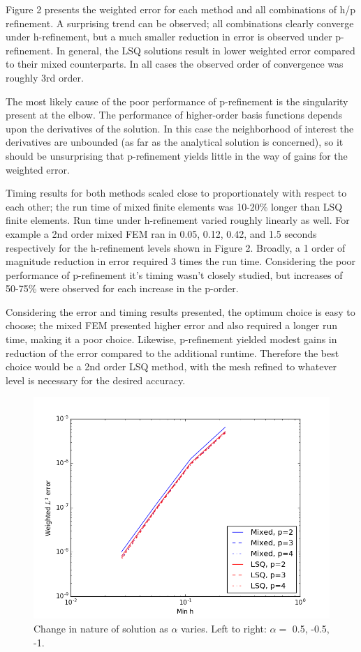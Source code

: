 \documentclass[letterpaper,10pt]{article}
\begin{document}
Figure 2 presents the weighted error for each method and all combinations of h/p refinement. A surprising trend can be observed; all combinations clearly converge under h-refinement, but a much smaller reduction in error is observed under p-refinement. In general, the LSQ solutions result in lower weighted error compared to their mixed counterparts. In all cases the observed order of convergence was roughly 3rd order.

The most likely cause of the poor performance of p-refinement is the singularity present at the elbow. The performance of higher-order basis functions depends upon the derivatives of the solution. In this case the neighborhood of interest the derivatives are unbounded (as far as the analytical solution is concerned), so it should be unsurprising that p-refinement yields little in the way of gains for the weighted error.

Timing results for both methods scaled close to proportionately with respect to each other; the run time of mixed finite elements was 10-20\% longer than LSQ finite elements. Run time under h-refinement varied roughly linearly as well. For example a 2nd order mixed FEM ran in 0.05, 0.12, 0.42, and 1.5 seconds respectively for the h-refinement levels shown in Figure 2. Broadly, a 1 order of magnitude reduction in error required 3 times the run time. Considering the poor performance of p-refinement it's timing wasn't closely studied, but increases of 50-75\% were observed for each increase in the p-order.

Considering the error and timing results presented, the optimum choice is easy to choose; the mixed FEM presented higher error and also required a longer run time, making it a poor choice. Likewise, p-refinement yielded modest gains in reduction of the error compared to the additional runtime. Therefore the best choice would be a 2nd order LSQ method, with the mesh refined to whatever level is necessary for the desired accuracy.

\begin{figure}[!htb]
\centering
\includegraphics[width=0.85 \linewidth]{errs.PNG}
\caption{Change in nature of solution as $\alpha$ varies. Left to right: $\alpha =$ 0.5, -0.5, -1.}
\end{figure}
\end{document}
